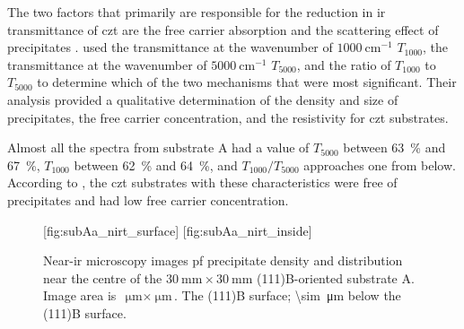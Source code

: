 The two factors that primarily are responsible for the reduction in \ac{ir} transmittance of \ac{czt} are the free carrier absorption and the scattering effect of precipitates \citep{yadava1994precipitation}. \citet{yujie2004infrared} used the transmittance at the wavenumber of $\SI{1000}{\centi\metre^{-1}}$ $T_{1000}$, the transmittance at the wavenumber of $\SI{5000}{\centi\metre^{-1}}$ $T_{5000}$, and the ratio of $T_{1000}$ to $T_{5000}$ to determine which of the two mechanisms that were most significant. Their analysis provided a qualitative determination of the density and size of  precipitates, the free carrier concentration, and the resistivity for \ac{czt} substrates. %

Almost all the spectra from substrate A had a value of $T_{5000}$ between \SI{63}{\percent} and \SI{67}{\percent}, $T_{1000}$ between \SI{62}{\percent} and \SI{64}{\percent}, and $T_{1000}/T_{5000}$ approaches one from below. According to \citet{yujie2004infrared}, the \ac{czt} substrates with these characteristics were free of precipitates and had low free carrier concentration.%

\begin{figure}[htbp]
    \centering
    [fig:subAa_nirt_surface]
    \hfill
    [fig:subAa_nirt_inside]
    \caption[Near-\ac{ir} microscopy images pf  precipitates in substrate A.]{Near-\ac{ir} microscopy images pf  precipitate density and distribution near the centre of the $\SI{30}{\milli\metre}\times\SI{30}{\milli\metre}$ (111)B-oriented substrate A. Image area is $\SI{}{\micro\metre}\times\SI{}{\micro\metre}$.  The (111)B surface;  \SI{\sim}{\micro\metre} below the (111)B surface.}\label{fig:subAa_nirt}
\end{figure}


\begin{comment}\todo{}
Mange artikler i denne katalogen: G:\Brukere\ESg\papers\CMT\CdZnTe

se spesielt på 
-	figurer i »CZT inclusions Belas 2008»
-	CZT substrates Japan Energy (de som lager våre subs)
-	Fig 1 i Defects in CZT. Hossain-2015

\end{comment}

